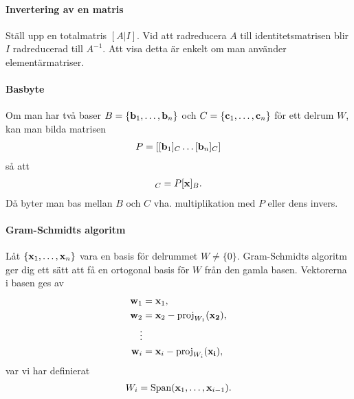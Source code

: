 \paragraph{Invertering av en matris}
Ställ upp en totalmatris $[A | I]$. Vid att radreducera $A$ till identitetsmatrisen blir $I$ radreducerad till $A^{-1}$. Att visa detta är enkelt om man använder elementärmatriser.

\paragraph{Basbyte}
Om man har två baser $B = \{\vect{b}_1, \dots, \vect{b}_n\}$ och $C = \{\vect{c}_1, \dots, \vect{c}_n\}$ för ett delrum $W$, kan man bilda matrisen
\begin{align*}
	P = [[\vect{b}_1]_C \dots [\vect{b}_n]_C]
\end{align*}
så att
\begin{align*}
	[\vect{x}]_C = P[\vect{x}]_B.
\end{align*}
Då byter man bas mellan $B$ och $C$ vha. multiplikation med $P$ eller dens invers.

\paragraph{Gram-Schmidts algoritm}
Låt $\{\vect{x}_1, \dots, \vect{x}_n\}$ vara en basis för delrummet $W\neq\{0\}$. Gram-Schmidts algoritm ger dig ett sätt att få en ortogonal basis för $W$ från den gamla basen. Vektorerna i basen ges av
\begin{align*}
	\vect{w}_1 &= \vect{x}_1, \\
	\vect{w}_2 &= \vect{x}_2 - \proj{W_1}{\vect{x_2}}, \\
	\vdots \\
	\vect{w}_i &= \vect{x}_i - \proj{W_i}{\vect{x_i}},
\end{align*}
var vi har definierat
\begin{align*}
	W_i = \Span{\vect{x}_1, \dots, \vect{x}_{i - 1}}.
\end{align*}